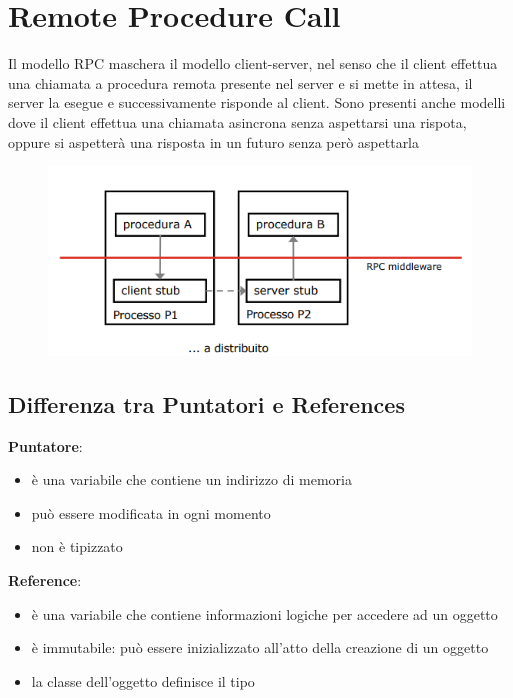 \documentclass[12pt, a4paper]{article}
\begin{document}
    \section{Remote Procedure Call}
    Il modello RPC maschera il modello client-server, nel senso che il client
    effettua una chiamata a procedura remota presente nel server e si mette in attesa, il server la esegue e successivamente
    risponde al client. Sono presenti anche modelli dove il client effettua una chiamata asincrona senza aspettarsi una rispota,
    oppure si aspetterà una risposta in un futuro senza però aspettarla
    \begin{figure}[htbp]
        \centering
        \includegraphics[scale=0.7]{rpc.png}
    \end{figure}
    
    \subsection*{Differenza tra Puntatori e References}
    \textbf{Puntatore}:
    \begin{itemize}
        \item è una variabile che contiene un indirizzo di memoria
        \item può essere modificata in ogni momento 
        \item non è tipizzato
    \end{itemize}
    \textbf{Reference}:
    \begin{itemize}
        \item è una variabile che contiene informazioni logiche per accedere ad un oggetto
        \item è immutabile: può essere inizializzato all'atto della creazione di un oggetto
        \item la classe dell'oggetto definisce il tipo
    \end{itemize}
\end{document}
